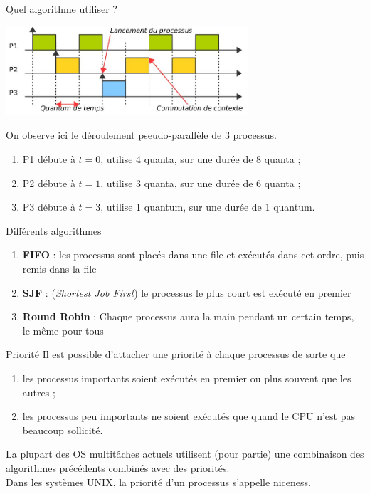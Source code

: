 \documentclass[10pt]{nsibeamer}
\begin{document}
\begin{frame}{Quel algorithme utiliser ?}
\begin{center}
\includegraphics[width=9cm]{img/3proc}
\end{center}\pause
On observe ici le déroulement \alert{pseudo-parallèle} de 3 processus.\pause
\begin{enumerate}[--]
	\item P1 débute à $t=0$, utilise 4 quanta, sur une durée de 8 quanta ;\pause
    \item P2 débute à $t=1$, utilise 3 quanta, sur une durée de 6 quanta ;\pause
    \item P3 débute à $t=3$, utilise 1 quantum, sur une durée de 1 quantum.
\end{enumerate}
\end{frame}
\begin{frame}{Différents algorithmes}

\begin{enumerate}[--]\pause
	\item \textbf{FIFO} : les processus sont placés dans une file et exécutés dans cet ordre, puis remis dans la file\pause
    \item \textbf{SJF} : (\textit{Shortest Job First}) le processus le plus court est exécuté en premier\pause
    \item \textbf{Round Robin} : Chaque processus aura la main pendant un certain temps, le même pour tous
\end{enumerate}
\end{frame}
\begin{frame}{Priorité}\pause
Il est possible d'attacher une priorité à chaque processus de sorte que\pause
\begin{enumerate}[--]
	\item les processus importants soient exécutés en premier ou plus souvent que les autres ;\pause
    \item les processus peu importants ne soient exécutés que quand le CPU n'est pas beaucoup sollicité.\pause
\end{enumerate}

La plupart des OS multitâches actuels utilisent (pour partie) une combinaison des algorithmes précédents combinés avec des priorités.\\\pause
Dans les systèmes \textsc{UNIX}, la priorité d'un processus s'appelle \alert{niceness}.
\end{frame}
\end{document}
